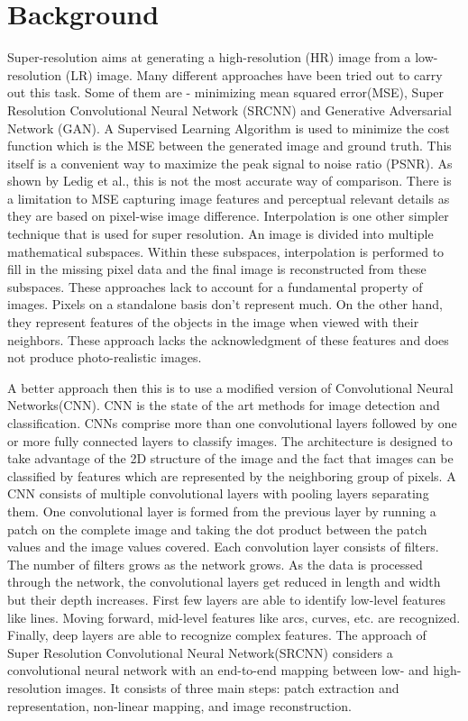 \section{Background}

Super-resolution aims at generating a high-resolution (HR) image from a
low-resolution (LR) image. Many different approaches have been tried out to
carry out this task. Some of them are - minimizing mean squared error(MSE),
Super Resolution Convolutional Neural Network (SRCNN) and Generative Adversarial
Network (GAN). A Supervised Learning Algorithm is used to minimize the cost
function which is the MSE between the generated image and ground truth. This
itself is a convenient way to maximize the peak signal to noise ratio (PSNR).
As shown by Ledig et al.\cite{Ledig}, this is not the most accurate way of comparison.
There is a limitation to MSE capturing image features and perceptual relevant
details as they are based on pixel-wise image difference. Interpolation is one
other simpler technique that is used for super resolution\cite{Siu}. An image is
divided into multiple mathematical subspaces. Within these subspaces,
interpolation is performed to fill in the missing pixel data and the final image
is reconstructed from these subspaces. These approaches lack to account for a
fundamental property of images. Pixels on a standalone basis don’t represent
much. On the other hand, they represent features of the objects in the image
when viewed with their neighbors. These approach lacks the acknowledgment of
these features and does not produce photo-realistic images\cite{Ferwerda}.

A better approach then this is to use a modified version of Convolutional Neural
Networks(CNN). CNN is the state of the art methods for image detection and
classification\cite{Krizhevsky, Jaswal2014}. CNNs comprise more than one convolutional layers followed
by one or more fully connected layers to classify images. The architecture is
designed to take advantage of the 2D structure of the image and the fact that
images can be classified by features which are represented by the neighboring
group of pixels. A CNN consists of multiple convolutional layers with pooling
layers separating them. One convolutional layer is formed from the previous
layer by running a patch on the complete image and taking the dot product
between the patch values and the image values covered. Each convolution layer
consists of filters. The number of filters grows as the network grows. As the
data is processed through the network, the convolutional layers get reduced in
length and width but their depth increases. First few layers are able to
identify low-level features like lines. Moving forward, mid-level features like
arcs, curves, etc. are recognized. Finally, deep layers are able to recognize
complex features. The approach of Super Resolution Convolutional Neural
Network(SRCNN)\cite{Long} considers a convolutional neural network with an end-to-end
mapping between low- and high-resolution images. It consists of three main
steps: patch extraction and representation, non-linear mapping, and image
reconstruction\cite{Long}.

